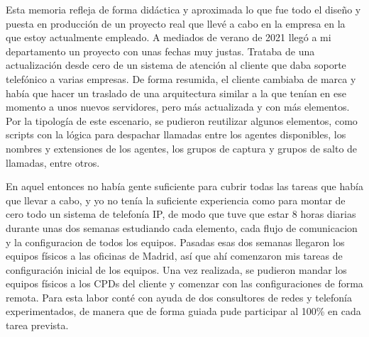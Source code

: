 \documentclass[a4paper, 12pt]{book}
\begin{document}
Esta memoria refleja de forma didáctica y aproximada lo que fue todo el diseño y puesta en producción de un proyecto real que llevé a cabo en la empresa en la que estoy actualmente empleado. 
A mediados de verano de 2021 llegó a mi departamento un proyecto con unas fechas muy justas. Trataba de una actualización desde cero de un sistema de atención al cliente que daba soporte telefónico a varias empresas. De forma resumida, el cliente cambiaba de marca y había que hacer un traslado de una arquitectura similar a la que tenían en ese momento a unos nuevos servidores, pero más actualizada y con más elementos. Por la tipología de este escenario, se pudieron reutilizar algunos elementos, como scripts con la lógica para despachar llamadas entre los agentes disponibles, los nombres y extensiones de los agentes, los grupos de captura y grupos de salto de llamadas, entre otros.

En aquel entonces no había gente suficiente para cubrir todas las tareas que había que llevar a cabo, y yo no tenía la suficiente experiencia como para montar de cero todo un sistema de telefonía IP, de modo que tuve que estar 8 horas diarias durante unas dos semanas estudiando cada elemento, cada flujo de comunicacion y la configuracion de todos los equipos. Pasadas esas dos semanas llegaron los equipos físicos a las oficinas de Madrid, así que ahí comenzaron mis tareas de configuración inicial de los equipos. 
Una vez realizada, se pudieron mandar los equipos físicos a los CPDs del cliente y comenzar con las configuraciones de forma remota. Para esta labor conté con ayuda de dos consultores de redes y telefonía experimentados, de manera que de forma guiada pude participar al 100\% en cada tarea prevista.
\end{document}
